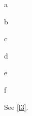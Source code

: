 \documentclass[envcountsame]{llncs}
\newcounter{case}
\begin{document}
\begin{lemma}a\end{lemma}
\begin{case}b\end{case}
\begin{case}c\end{case}
\begin{lemma}d\end{lemma}
\begin{case}e\end{case}
\begin{lemma}\label{l3}f\end{lemma}
See \ref{l3}.
\end{document}
